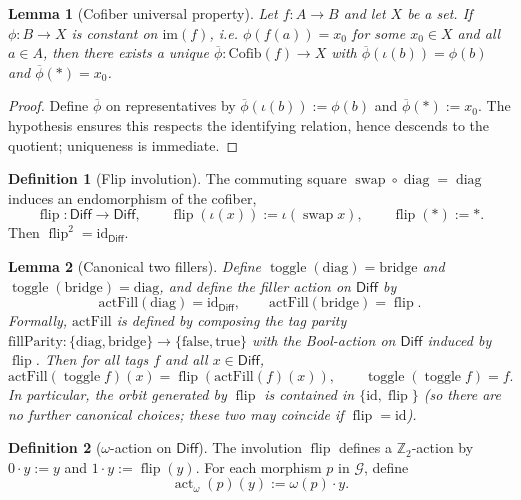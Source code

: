 \documentclass[aps,prl,reprint]{revtex4-2}
\newcommand{\Diff}{\mathsf{Diff}}
\newcommand{\diag}{\operatorname{diag}}
\newcommand{\swap}{\operatorname{swap}}
\newcommand{\flip}{\operatorname{flip}}
\newcommand{\actomega}{\operatorname{act}_\omega}
\newcommand{\Ztwo}{\mathbb{Z}_2}
\theoremstyle{definition}
\newtheorem{definition}{Definition}[section]
\theoremstyle{plain}
\newtheorem{lemma}{Lemma}[section]
\begin{document}
\begin{lemma}[Cofiber universal property]
\label{lem:cofiber-up}
Let $f:A\to B$ and let $X$ be a set. If $\phi:B\to X$ is constant on $\mathrm{im}(f)$,
i.e. $\phi(f(a))=x_0$ for some $x_0\in X$ and all $a\in A$, then there exists a unique
$\overline\phi:\mathrm{Cofib}(f)\to X$ with $\overline\phi(\iota(b))=\phi(b)$ and
$\overline\phi(\ast)=x_0$.

\end{lemma}

\begin{proof}
Define $\overline\phi$ on representatives by $\overline\phi(\iota(b)):=\phi(b)$ and
$\overline\phi(\ast):=x_0$. The hypothesis ensures this respects the identifying
relation, hence descends to the quotient; uniqueness is immediate.
\end{proof}

\begin{definition}[Flip involution]
The commuting square $\swap\circ\diag=\diag$ induces an endomorphism of the cofiber,
\[\flip:\Diff\to\Diff,\qquad \flip(\iota(x)):=\iota(\swap x),\qquad \flip(\ast):=\ast.\]
Then $\flip^2=\mathrm{id}_{\Diff}$.

\end{definition}

\begin{lemma}[Canonical two fillers]
\label{lem:canonical-fillers}
Define $\operatorname{toggle}(\mathrm{diag})=\mathrm{bridge}$ and $\operatorname{toggle}(\mathrm{bridge})=\mathrm{diag}$, and
define the filler action on $\Diff$ by
\[
\mathrm{actFill}(\mathrm{diag})=\mathrm{id}_{\Diff},\qquad
\mathrm{actFill}(\mathrm{bridge})=\flip.
\]
Formally, $\mathrm{actFill}$ is defined by composing the tag parity
$\mathrm{fillParity}:\{\mathrm{diag},\mathrm{bridge}\}\to\{\mathrm{false},\mathrm{true}\}$
with the Bool-action on $\Diff$ induced by $\flip$.
Then for all tags $f$ and all $x\in\Diff$,
\[
\mathrm{actFill}(\operatorname{toggle} f)(x)=\flip(\mathrm{actFill}(f)(x)),\qquad
\operatorname{toggle}(\operatorname{toggle} f)=f.
\]
In particular, the orbit generated by $\flip$ is contained in $\{\mathrm{id},\flip\}$
(so there are no further canonical choices; these two may coincide if $\flip=\mathrm{id}$).

\end{lemma}

\begin{definition}[$\omega$-action on $\Diff$]
\label{def:limited-scope-theorem-translation-clean-008}
The involution $\flip$ defines a $\Ztwo$-action by $0\cdot y:=y$ and $1\cdot y:=\flip(y)$.
For each morphism $p$ in $\mathcal G$, define
\[\actomega(p)(y):=\omega(p)\cdot y.\]

\end{definition}
\end{document}
